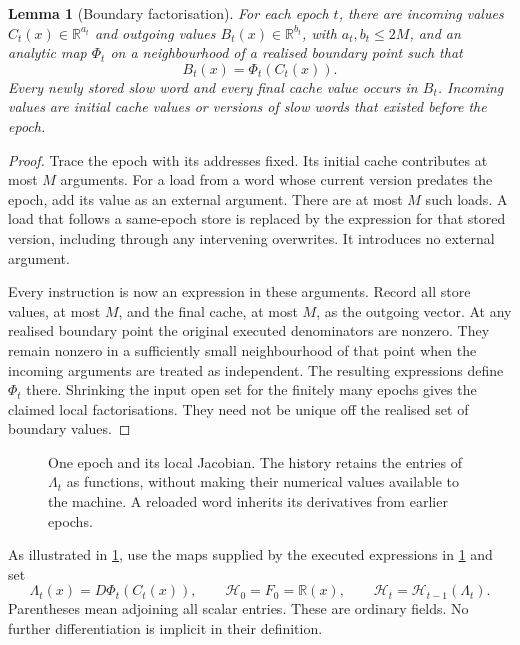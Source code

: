 \documentclass[11pt]{article}
\newtheorem{lemma}[lemma]{Lemma}
\theoremstyle{definition}
\theoremstyle{remark}
\newcommand{\R}{\mathbb R}
\newcommand{\cH}{\mathcal H}
\begin{document}
\begin{lemma}[Boundary factorisation]
\label{lem:boundary}
For each epoch $t$, there are incoming values $C_t(x)\in\R^{a_t}$ and
outgoing values $B_t(x)\in\R^{b_t}$, with $a_t,b_t\le2M$, and an
analytic map $\Phi_t$ on a neighbourhood of a realised boundary point
such that
\begin{equation}
 B_t(x)=\Phi_t(C_t(x)).
 \label{eq:boundary}
\end{equation}
Every newly stored slow word and every final cache value occurs in
$B_t$. Incoming values are initial cache values or versions of slow
words that existed before the epoch.
\end{lemma}
\begin{proof}
Trace the epoch with its addresses fixed. Its initial cache contributes
at most $M$ arguments. For a load from a word whose current version
predates the epoch, add its value as an external argument. There are
at most $M$ such loads. A load that follows a same-epoch store is
replaced by the expression for that stored version, including through
any intervening overwrites. It introduces no external argument.

Every instruction is now an expression in these arguments. Record
all store values, at most $M$, and the final cache, at most $M$, as the
outgoing vector. At any realised boundary point the original executed
denominators are nonzero. They remain nonzero in a sufficiently small
neighbourhood of that point when the incoming arguments are treated
as independent. The resulting expressions define $\Phi_t$ there.
Shrinking the input open set for the finitely many epochs gives the
claimed local factorisations. They need not be unique off the realised
set of boundary values.
\end{proof}

\begin{figure}[t]
 \centering
 \caption{One epoch and its local Jacobian. The history retains the
 entries of $\Lambda_t$ as functions, without making their numerical
 values available to the machine. A reloaded word inherits its derivatives from earlier epochs.}
 \label{fig:epoch}
\end{figure}

As illustrated in \cref{fig:epoch}, use the maps supplied by the
executed expressions in \cref{lem:boundary} and set
\begin{equation}
 \Lambda_t(x)=D\Phi_t(C_t(x)),\qquad
 \cH_0=F_0=\R(x),\qquad
 \cH_t=\cH_{t-1}(\Lambda_t).
 \label{eq:history}
\end{equation}
Parentheses mean adjoining all scalar entries. These are ordinary
fields. No further differentiation is implicit in their definition.
\end{document}
